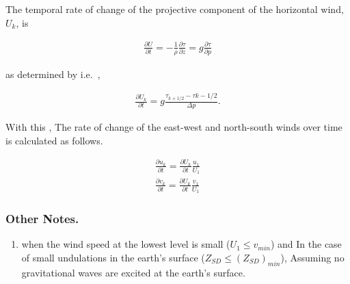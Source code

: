 The temporal rate of change of the projective component of the
horizontal wind, \(U_{k}\), is

\begin{eqnarray}
  \frac{\partial U}{\partial t} 
        = - \frac{1}{\rho} \frac{\partial \tau}{\partial z}
        = g  \frac{\partial \tau}{\partial p}
\end{eqnarray}

as determined by i.e.~,

\begin{eqnarray}
  \frac{\partial U_{k}}{\partial t} 
        =  g  \frac{\tau_{k+1/2} - \tau{k-1/2}}{\Delta p}.
\end{eqnarray}

With this , The rate of change of the east-west and north-south winds
over time is calculated as follows.

\begin{eqnarray}
  \frac{\partial u_{k}}{\partial t}  = 
           \frac{\partial U_{k}}{\partial t} \frac{u_{1}}{U_{1}} \\
  \frac{\partial v_{k}}{\partial t}  = 
           \frac{\partial U_{k}}{\partial t} \frac{v_{1}}{U_{1}}
\end{eqnarray}

\hypertarget{other-notes.}{%
\subsubsection{Other Notes.}\label{other-notes.}}

\begin{enumerate}
\def\labelenumi{\arabic{enumi}.}
\tightlist
\item
  when the wind speed at the lowest level is small
  (\(U_{1} \le v_{min}\)) and In the case of small undulations in the
  earth's surface (\(Z_{SD} \le (Z_{SD})_{min}\)), Assuming no
  gravitational waves are excited at the earth's surface.
\end{enumerate}
